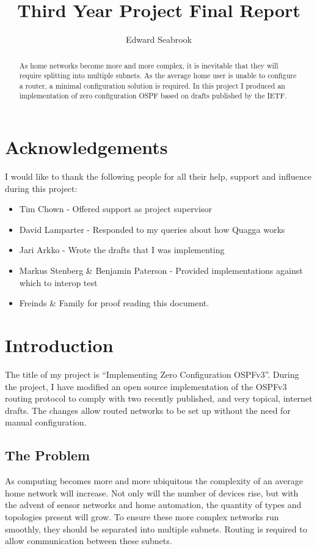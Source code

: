\documentclass[12pt]{report}
\author{Edward Seabrook}
\title{Third Year Project Final Report}
\begin{document}


\begin{abstract}
As home networks become more and more complex, it is inevitable that they will
require splitting into multiple subnets. As the average home user is unable to
configure a router, a minimal configuration solution is required. In this
project I produced an implementation of zero configuration OSPF based on drafts
published by the IETF\@{}. 
\end{abstract}

\tableofcontents
\clearpage

\chapter*{Acknowledgements}
I would like to thank the following people for all their help, support and
influence during this project:
\begin{itemize}
\item Tim Chown - Offered support as project supervisor
\item David Lamparter - Responded to my queries about how Quagga works
\item Jari Arkko - Wrote the drafts that I was implementing
\item Markus Stenberg \& Benjamin Paterson - Provided implementations against which 
      to interop test
\item Freinds \& Family for proof reading this document.
\end{itemize}

\chapter{Introduction}
The title of my project is ``Implementing Zero Configuration OSPFv3''. During
the project, I have modified an open source implementation of the OSPFv3
routing protocol to comply with two recently published, and very topical,
internet drafts. The changes allow routed networks to be set up without the
need for manual configuration.

\section{The Problem}
As computing becomes more and more ubiquitous the complexity of an average home
network will increase. Not only will the number of devices rise, but with the
advent of sensor networks and home automation, the quantity of types and
topologies present will grow. To ensure these more complex networks run
smoothly, they should be separated into multiple subnets. Routing is required
to allow communication between these subnets. 
\end{document}
